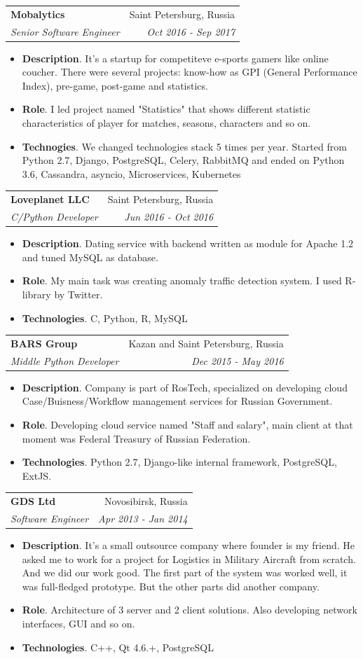 \documentclass[letterpaper,11pt]{article}
\makeatletter
\newcommand{\resumeItem}[2]{
  \item\small{
    \textbf{#1}{. #2 \vspace{-2pt}}
  }
}
\newcommand{\resumeSubheading}[4]{
  \vspace{-1pt}\item
    \begin{tabular*}{0.97\textwidth}{l@{\extracolsep{\fill}}r}
      \textbf{#1} & #2 \\
      \textit{\small#3} & \textit{\small #4} \\
    \end{tabular*}\vspace{-5pt}
}
\newcommand{\resumeItemListStart}{\begin{itemize}}
\newcommand{\resumeItemListEnd}{\end{itemize}\vspace{-5pt}}
\makeatother
\begin{document}
    \resumeSubheading
      {Mobalytics}{Saint Petersburg, Russia}
      {Senior Software Engineer}{Oct 2016 - Sep 2017}
      \resumeItemListStart
        \resumeItem{Description}
          {It's a startup for competiteve e-sports gamers like online coucher. There were several projects: know-how as GPI (General Performance Index), pre-game, post-game and statistics.}
	\resumeItem{Role}
	  {I led project named "Statistics" that shows different statistic characteristics of player for matches, seasons, characters and so on.}
        \resumeItem{Technogies}
	  {We changed technologies stack 5 times per year. Started from Python 2.7, Django, PostgreSQL, Celery, RabbitMQ and ended on Python 3.6, Cassandra, asyncio, Microservices, Kubernetes}
      \resumeItemListEnd

     \resumeSubheading
       {Loveplanet LLC}{Saint Petersburg, Russia}
       {C/Python Developer}{Jun 2016 - Oct 2016}
       \resumeItemListStart
         \resumeItem{Description}
	   {Dating service with backend written as module for Apache 1.2 and tuned MySQL as database.}
	 \resumeItem{Role}
	   {My main task was creating anomaly traffic detection system. I used R-library by Twitter.}
	 \resumeItem{Technologies}
	   {C, Python, R, MySQL}
       \resumeItemListEnd

     \resumeSubheading
       {BARS Group}{Kazan and Saint Petersburg, Russia}
       {Middle Python Developer}{Dec 2015 - May 2016}
       \resumeItemListStart
         \resumeItem{Description}
	   {Company is part of RosTech, specialized on developing cloud Case/Buisness/Workflow management services for Russian Government.}
	 \resumeItem{Role}
	   {Developing cloud service named "Staff and salary", main client at that moment was Federal Treasury of Russian Federation.}
	 \resumeItem{Technologies}
	   {Python 2.7, Django-like internal framework, PostgreSQL, ExtJS.}
       \resumeItemListEnd

     \resumeSubheading
       {GDS Ltd}{Novosibirsk, Russia}
       {Software Engineer}{Apr 2013 - Jan 2014}
       \resumeItemListStart
         \resumeItem{Description}
	   {It's a small outsource company where founder is my friend. He asked me to work for a project for Logistics in Military Aircraft from scratch. And we did our work good. The first part of the system was worked well, it was full-fledged prototype. But the other parts did another company.}
	 \resumeItem{Role}
	   {Architecture of 3 server and 2 client solutions. Also developing network interfaces, GUI and so on.}
	 \resumeItem{Technologies}
	   {C++, Qt 4.6.+, PostgreSQL}
       \resumeItemListEnd
\end{document}
